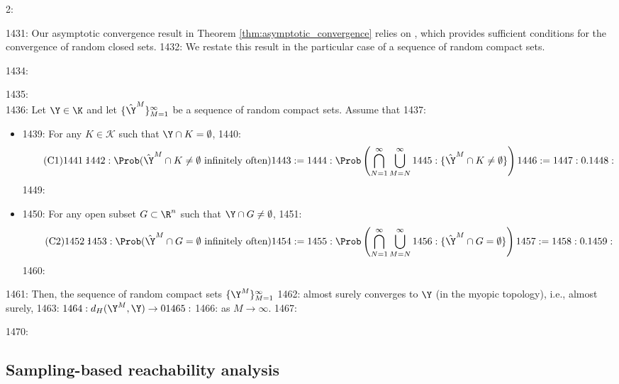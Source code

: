 2: \documentclass[12pt]{l4dc2022} %
\begin{document}
1431: Our asymptotic convergence result in Theorem \ref{thm:asymptotic_convergence} relies on \citep[Proposition 1.7.23]{Molchanov_BookTheoryOfRandomSets2017}, which provides sufficient conditions for the convergence of random closed sets. 
1432: We restate this result in the particular case of a sequence of random compact sets.

1434:  \begin{thm}\label{thm:conv_randSets_detLim}
1435:  \\
1436: Let $\Y\in\K$ and let $\{\hat\Y^M\}_{M=1}^\infty$ be a sequence of random compact sets. Assume that 
1437: \begin{itemize}[leftmargin=5.5mm]
1438: \item 
1439: For any $K\in\mathcal{K}$ such that $\Y\cap K=\emptyset$,
1440: \begin{equation}\tag{{C1}}\label{eq:C1}
1441: \hspace{-2mm}
1442: \Prob(\hat\Y^M\cap K \neq \emptyset \ \textrm{infinitely often}) 
1443: = 
1444: \Prob\left(\bigcap_{N=1}^\infty\bigcup_{M=N}^\infty
1445: \{\hat\Y^M\cap K \neq \emptyset\}\right) 
1446: =
1447: 0.
1448: \end{equation}
1449: \item
1450: For any open subset $G\subset\R^n$ such that $\Y\cap G \neq \emptyset$,
1451: \begin{equation}\tag{{C2}}\label{eq:C2}
1452: \hspace{-2mm}
1453: \Prob(\hat\Y^M\cap G = \emptyset \ \textrm{infinitely often}) 
1454: = 
1455: \Prob\left(\bigcap_{N=1}^\infty\bigcup_{M=N}^\infty
1456: \{\hat\Y^M\cap G = \emptyset\}\right) 
1457: = 
1458: 0.
1459: \end{equation}
1460: \end{itemize}
1461: Then, the sequence of random compact sets $\{\Y^M\}_{M=1}^\infty$ 
1462: almost surely converges to $\Y$ (in the myopic topology), i.e., almost surely,
1463: $
1464: d_H(\Y^M,\Y)\rightarrow 0
1465: $ 
1466:  as $M\rightarrow\infty$.
1467: \end{thm}

1470: \subsection{Sampling-based reachability analysis}
\end{document}
